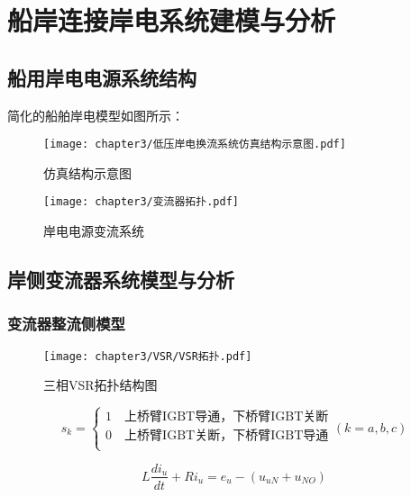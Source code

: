 \chapter{船岸连接岸电系统建模与分析}

\section{船用岸电电源系统结构}

简化的船舶岸电模型如图所示：

\begin{figure}[!htp]
	\centering
	\texttt{[image: chapter3/低压岸电换流系统仿真结构示意图.pdf]}
	\caption{仿真结构示意图}
	\label{fig:仿真结构示意图}
\end{figure}

\begin{figure}[!htp]
	\centering
	\texttt{[image: chapter3/变流器拓扑.pdf]}
	\caption{岸电电源变流系统}
	\label{fig:岸电电源变流系统}
\end{figure}



\section{岸侧变流器系统模型与分析}


\subsection{变流器整流侧模型}

\zhlipsum[1]

\begin{figure}[!htp]
	\centering
	\texttt{[image: chapter3/VSR/VSR拓扑.pdf]}
	\caption{三相VSR拓扑结构图}
	\label{fig:三相VSR拓扑结构图}
\end{figure}

\begin{equation}
	s_{k} =
	\begin{cases}
		1 \quad \text{上桥臂IGBT导通，下桥臂IGBT关断} \\
		0 \quad \text{上桥臂IGBT关断，下桥臂IGBT导通} \\
	\end{cases}
	(k=a,b,c)
	\label{equ:Sk}
\end{equation}

\begin{equation}
	L\frac{di_{u}}{dt}+Ri_{u}=e_{u}-(u_{uN}+u_{NO})
	\label{equ:3-3}
\end{equation}

